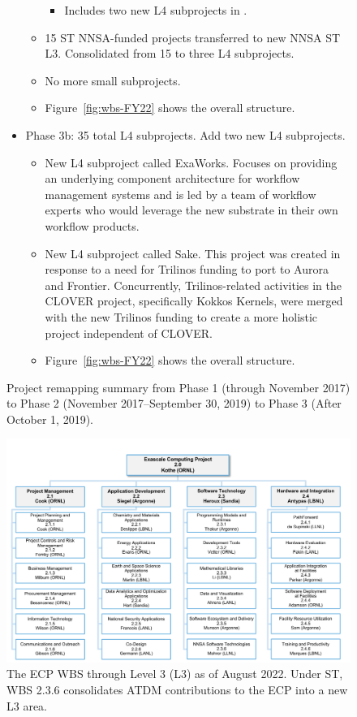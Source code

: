 \begin{figure}
\begin{mdframed}
\begin{itemize}
\begin{itemize}
\begin{itemize}
	\item Includes two new L4 subprojects in \ecosystem.
	\end{itemize}
	\item 15 ST NNSA-funded projects transferred to new NNSA ST L3. Consolidated from 15 to three L4 subprojects.
	\item No more small subprojects.
	\item Figure~\ref{fig:wbs-FY22} shows the overall structure.
\end{itemize}
\item Phase 3b: 35 total L4 subprojects.  Add two new L4 subprojects.
\begin{itemize}
	\item New L4 subproject called ExaWorks.  Focuses on providing an underlying component architecture for workflow management systems and is led by a team of workflow experts who would leverage the new substrate in their own workflow products.
	\item New L4 subproject called Sake.  This project was created in response to a need for Trilinos funding to port to Aurora and Frontier.  Concurrently, Trilinos-related activities in the CLOVER project, specifically Kokkos Kernels, were merged with the new Trilinos funding to create a more holistic project independent of CLOVER.
	\item Figure~\ref{fig:wbs-FY22} shows the overall structure.
\end{itemize}
\end{itemize}
\end{mdframed}

\caption{\label{fig:project-remapping}Project remapping summary from Phase 1 (through November 2017) to Phase 2 (November 2017--September 30, 2019) to Phase 3 (After October 1, 2019).}
\end{figure}




\begin{figure}
	\centering
	\includegraphics[width=1.0\linewidth]{ECP22}
	\caption{The ECP WBS through Level 3 (L3) as of August 2022. Under ST, WBS 2.3.6 consolidates ATDM contributions to the ECP into a new L3 area.}
	\label{fig:ecp22}
\end{figure}

